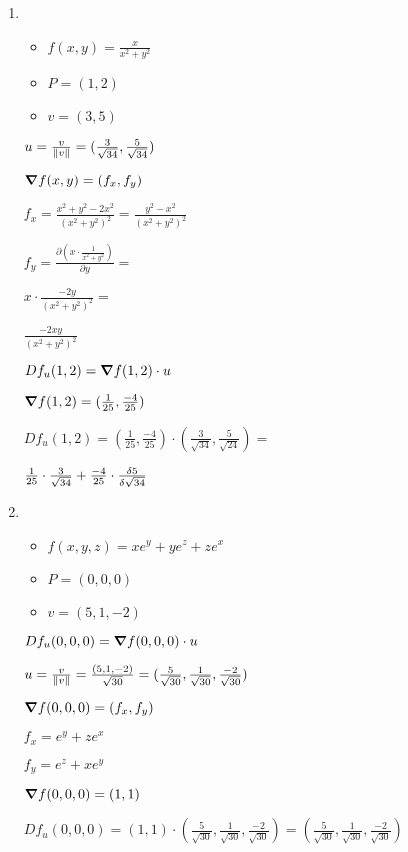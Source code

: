 \documentclass[../practica_04.tex]{subfiles}
\begin{document}
    \begin{enumerate}
        \item 
            \begin{itemize}
                \item $f(x,y) = \frac{x}{x^2+y^2}$
                \item $P = (1,2)$
                \item $v = (3,5)$
            \end{itemize}

            $ u = \frac{v}{\norm*{v}} = (\frac{3}{\sqrt{34}},\frac{5}{\sqrt{34}})$

            $ \grad f(x,y) = (f_x, f_y) $

            $ f_x = \frac{x^2 + y^2 - 2x^2}{(x^2+y^2)^2} = \frac{y^2 - x^2}{(x^2+y^2)^2} $

            $ f_y = \frac{\partial (x \cdot \frac{1}{x^2+y^2})}{\partial y} = $

            $ x \cdot \frac{ -2y }{(x^2+y^2)^2} = $

            $ \frac{ -2xy }{(x^2+y^2)^2} $

            $ Df_u(1,2) = \grad f(1,2) \cdot u $

            $ \grad f(1,2) = (\frac{1}{25}, \frac{-4}{25}) $

            $ Df_u(1,2) = (\frac{1}{25}, \frac{-4}{25}) \cdot (\frac{3}{\sqrt{34}},\frac{5}{\sqrt{24}}) = $

            $ \frac{1}{25}\cdot \frac{3}{\sqrt{34}} + \frac{-4}{25} \cdot \functionalderivative{5}{\sqrt{34}} $

        \item 
            \begin{itemize}
                \item $f(x,y,z) = xe^y + ye^z + ze^x $
                \item $P = (0,0,0)$
                \item $v = (5,1,-2)$
            \end{itemize}

            $Df_u(0,0,0) = \grad f(0,0,0) \cdot u $

            $ u = \frac{v}{\norm*{v}} = \frac{(5,1,-2)}{\sqrt{30}} = (\frac{5}{\sqrt{30}},\frac{1}{\sqrt{30}},\frac{-2}{\sqrt{30}}) $

            $ \grad f(0,0,0) = (f_x,f_y) $

            $ f_x = e^y + ze^x $

            $ f_y = e^z + xe^y $

            $ \grad f(0,0,0) = (1,1) $

            $ Df_u(0,0,0) = (1,1) \cdot (\frac{5}{\sqrt{30}},\frac{1}{\sqrt{30}},\frac{-2}{\sqrt{30}}) = (\frac{5}{\sqrt{30}},\frac{1}{\sqrt{30}},\frac{-2}{\sqrt{30}}) $

    \end{enumerate}
\end{document}
